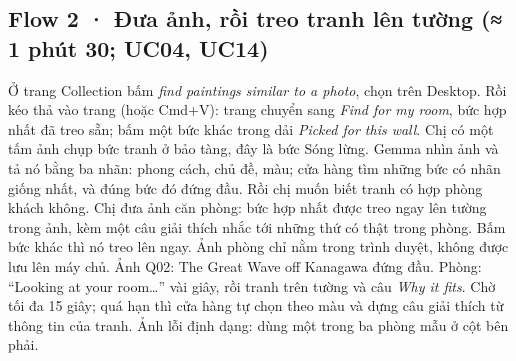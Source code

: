 \subsection{Flow 2 · Đưa ảnh, rồi treo tranh lên tường \normalfont\small(≈ 1 phút 30; UC04, UC14)}
Ở trang Collection bấm \emph{find paintings similar to a photo}, chọn  trên Desktop. Rồi kéo thả  vào trang (hoặc Cmd+V): trang chuyển sang \emph{Find for my room}, bức hợp nhất đã treo sẵn; bấm một bức khác trong dải \emph{Picked for this wall}.
Chị có một tấm ảnh chụp bức tranh ở bảo tàng, đây là bức Sóng lừng. Gemma nhìn ảnh và tả nó bằng ba nhãn: phong cách, chủ đề, màu; cửa hàng tìm những bức có nhãn giống nhất, và đúng bức đó đứng đầu.  Rồi chị muốn biết tranh có hợp phòng khách không. Chị đưa ảnh căn phòng: bức hợp nhất được treo ngay lên tường trong ảnh, kèm một câu giải thích nhắc tới những thứ có thật trong phòng.  Bấm bức khác thì nó treo lên ngay. Ảnh phòng chỉ nằm trong trình duyệt, không được lưu lên máy chủ.
Ảnh Q02: The Great Wave off Kanagawa đứng đầu. Phòng: ``Looking at your room\ldots'' vài giây, rồi tranh trên tường và câu \emph{Why it fits}.
Chờ tối đa 15 giây; quá hạn thì cửa hàng tự chọn theo màu và dựng câu giải thích từ thông tin của tranh. Ảnh lỗi định dạng: dùng một trong ba phòng mẫu ở cột bên phải.

